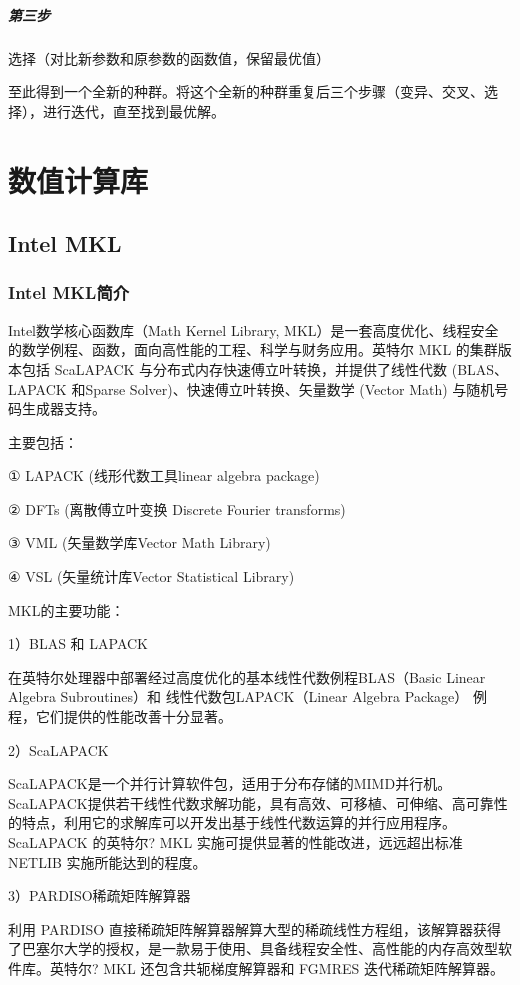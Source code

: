 \paragraph{第三步} 选择（对比新参数和原参数的函数值，保留最优值）


至此得到一个全新的种群。将这个全新的种群重复后三个步骤（变异、交叉、选择），进行迭代，直至找到最优解。





\chapter{数值计算库}
\section{Intel MKL}
\subsection{Intel MKL简介}
Intel数学核心函数库（Math Kernel Library, MKL）是一套高度优化、线程安全的数学例程、函数，面向高性能的工程、科学与财务应用。英特尔 MKL 的集群版本包括 ScaLAPACK 与分布式内存快速傅立叶转换，并提供了线性代数 (BLAS、LAPACK 和Sparse Solver)、快速傅立叶转换、矢量数学 (Vector Math) 与随机号码生成器支持。

主要包括：

① LAPACK (线形代数工具linear algebra package)

② DFTs (离散傅立叶变换 Discrete Fourier transforms)

③ VML (矢量数学库Vector Math Library)

④ VSL (矢量统计库Vector Statistical Library)

 
MKL的主要功能：

1）BLAS 和 LAPACK

在英特尔处理器中部署经过高度优化的基本线性代数例程BLAS（Basic Linear Algebra Subroutines）和 线性代数包LAPACK（Linear Algebra Package） 例程，它们提供的性能改善十分显著。
 
2）ScaLAPACK

ScaLAPACK是一个并行计算软件包，适用于分布存储的MIMD并行机。ScaLAPACK提供若干线性代数求解功能，具有高效、可移植、可伸缩、高可靠性的特点，利用它的求解库可以开发出基于线性代数运算的并行应用程序。
ScaLAPACK 的英特尔? MKL 实施可提供显著的性能改进，远远超出标准 NETLIB 实施所能达到的程度。
 
3）PARDISO稀疏矩阵解算器

利用 PARDISO 直接稀疏矩阵解算器解算大型的稀疏线性方程组，该解算器获得了巴塞尔大学的授权，是一款易于使用、具备线程安全性、高性能的内存高效型软件库。英特尔? MKL 还包含共轭梯度解算器和 FGMRES 迭代稀疏矩阵解算器。
 

